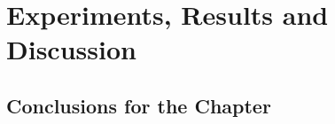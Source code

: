 \chapter{Experiments, Results and Discussion} \label{cap:proposal}






\section{Conclusions for the Chapter}



